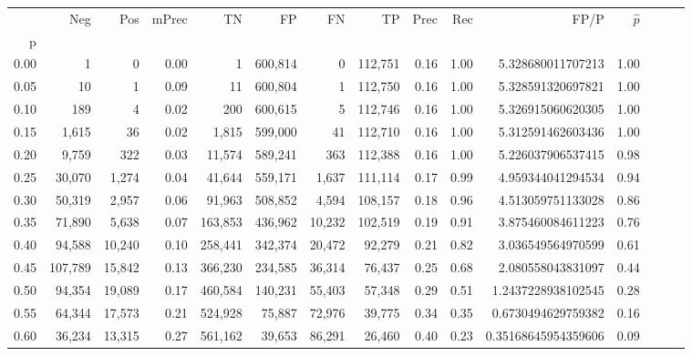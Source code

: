 \begin{tabular}{rrrrrrrrrrrrrrr}
\toprule
{} &      Neg &     Pos & mPrec &       TN &       FP &       FN &       TP &  Prec &   Rec &                    FP/P & $\hat{p}$ \\
p    &          &         &       &          &          &          &          &       &       &                         &           \\
\midrule
0.00 &        1 &       0 &  0.00 &        1 &  600,814 &        0 &  112,751 &  0.16 &  1.00 &       5.328680011707213 &      1.00 \\
0.05 &       10 &       1 &  0.09 &       11 &  600,804 &        1 &  112,750 &  0.16 &  1.00 &       5.328591320697821 &      1.00 \\
0.10 &      189 &       4 &  0.02 &      200 &  600,615 &        5 &  112,746 &  0.16 &  1.00 &       5.326915060620305 &      1.00 \\
0.15 &    1,615 &      36 &  0.02 &    1,815 &  599,000 &       41 &  112,710 &  0.16 &  1.00 &       5.312591462603436 &      1.00 \\
0.20 &    9,759 &     322 &  0.03 &   11,574 &  589,241 &      363 &  112,388 &  0.16 &  1.00 &       5.226037906537415 &      0.98 \\
0.25 &   30,070 &   1,274 &  0.04 &   41,644 &  559,171 &    1,637 &  111,114 &  0.17 &  0.99 &       4.959344041294534 &      0.94 \\
0.30 &   50,319 &   2,957 &  0.06 &   91,963 &  508,852 &    4,594 &  108,157 &  0.18 &  0.96 &       4.513059751133028 &      0.86 \\
0.35 &   71,890 &   5,638 &  0.07 &  163,853 &  436,962 &   10,232 &  102,519 &  0.19 &  0.91 &       3.875460084611223 &      0.76 \\
0.40 &   94,588 &  10,240 &  0.10 &  258,441 &  342,374 &   20,472 &   92,279 &  0.21 &  0.82 &       3.036549564970599 &      0.61 \\
0.45 &  107,789 &  15,842 &  0.13 &  366,230 &  234,585 &   36,314 &   76,437 &  0.25 &  0.68 &       2.080558043831097 &      0.44 \\
0.50 &   94,354 &  19,089 &  0.17 &  460,584 &  140,231 &   55,403 &   57,348 &  0.29 &  0.51 &      1.2437228938102545 &      0.28 \\
0.55 &   64,344 &  17,573 &  0.21 &  524,928 &   75,887 &   72,976 &   39,775 &  0.34 &  0.35 &      0.6730494629759382 &      0.16 \\
0.60 &   36,234 &  13,315 &  0.27 &  561,162 &   39,653 &   86,291 &   26,460 &  0.40 &  0.23 &     0.35168645954359606 &      0.09 \\

\end{tabular}

